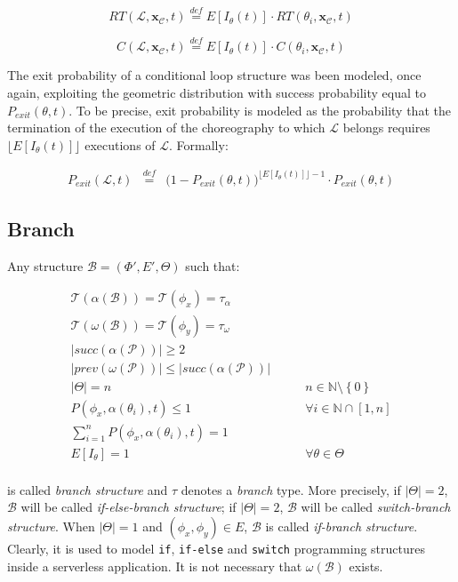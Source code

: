 \documentclass[12pt,a4paper]{report}
\newcommand{\mathDef}{\overset{\textit{def}}{=}}
\newcommand{\N}{\mathbb{N}}
\newcommand{\SetFromOneTo}[1]{\N \cap \left[1,#1\right]}
\begin{document}
\begin{equation}
	RT(\mathcal{L},\textbf{x}_{\mathcal{C}}, t) \mathDef E[I_{\theta}(t)] \cdot RT(\theta_i,\textbf{x}_{\mathcal{C}}, t)
\end{equation}

\begin{equation}
	C(\mathcal{L},\textbf{x}_{\mathcal{C}}, t) \mathDef E[I_{\theta}(t)] \cdot C(\theta_i,\textbf{x}_{\mathcal{C}}, t)
\end{equation}

The exit probability of a conditional loop structure was been modeled, once again, exploiting the geometric distribution with success probability equal to $P_{exit}(\theta, t)$. To be precise, exit probability is modeled as the probability that the termination of the execution of the choreography to which $\mathcal{L}$ belongs requires $\lfloor E[I_{\theta}(t)] \rfloor$  executions of $\mathcal{L}$. Formally:

\begin{eqnarray}
	P_{exit}(\mathcal{L}, t) & \mathDef & \Big(1 -P_{exit}(\theta, t)  \Big)^{\lfloor E[I_{\theta}(t)] \rfloor - 1} \cdot P_{exit}(\theta, t)
\end{eqnarray}

\subsection{Branch}

Any structure $\mathcal{B} = (\Phi',E',\Theta)$ such that:

\begin{eqnarray}
	\mathscr{T}(\alpha(\mathcal{B})) = \mathscr{T}(\phi_x) = \tau_{\alpha} \\ \mathscr{T}(\omega(\mathcal{B})) = \mathscr{T}(\phi_y) = \tau_{\omega} \\
	|succ(\alpha(\mathcal{P}))| \geq 2 \\
	|prev(\omega(\mathcal{P}))| \leq |succ(\alpha(\mathcal{P}))| \\
	|\Theta| = n  & \qquad n \in \N \setminus \left\{0\right\} \\
	P(\phi_x, \alpha(\theta_i),t) \leq 1 & \qquad \forall i \in \SetFromOneTo{n} \\
	\sum_{i = 1}^n P(\phi_x, \alpha(\theta_i),t) = 1 & \\
	E[I_{\theta}] = 1 & \qquad \forall \theta \in \Theta \\
\end{eqnarray}

is called \textit{branch structure} and $\tau$ denotes a \textit{branch} type. More precisely, if $|\Theta| = 2$, $\mathcal{B}$ will be called \textit{if-else-branch structure}; if $|\Theta| = 2$, $\mathcal{B}$ will be called \textit{switch-branch structure}. When $|\Theta| = 1$ and $(\phi_x,\phi_y) \in E$, $\mathcal{B}$ is called \textit{if-branch structure}. Clearly, it is used to model \texttt{if}, \texttt{if-else} and \texttt{switch} programming structures inside a serverless application. It is not necessary that $\omega(\mathcal{B})$ exists.
\end{document}
